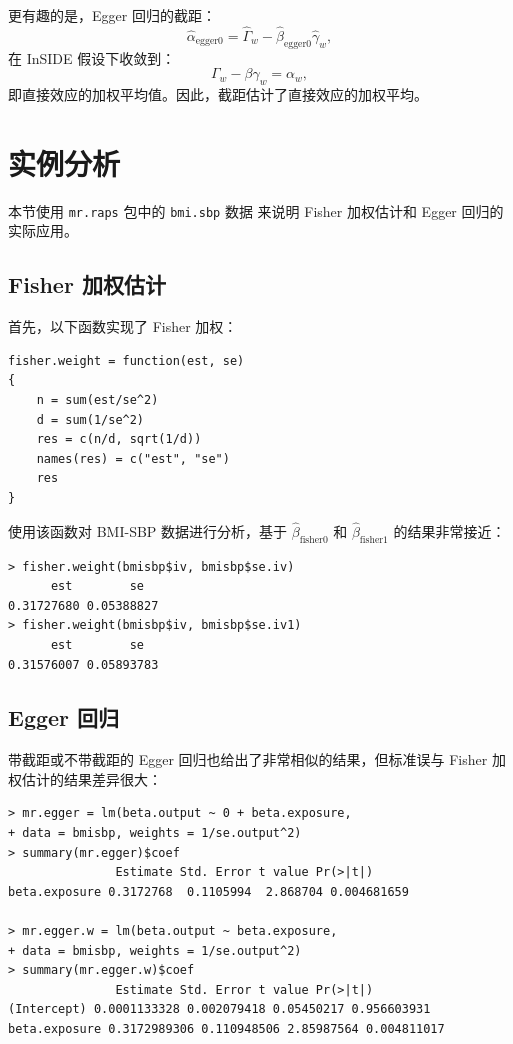 更有趣的是，Egger 回归的截距：
\[
\hat\alpha_{\mathrm{egger0}} = \hat\Gamma_w - \hat\beta_{\mathrm{egger0}} \hat\gamma_w, \tag{25.20}
\]
在 InSIDE 假设下收敛到：
\[
\Gamma_w - \beta\gamma_w = \alpha_w, \tag{25.21}
\]
即直接效应的加权平均值。因此，截距估计了直接效应的加权平均。

\section{实例分析}\label{sec:25-example}

本节使用 \texttt{mr.raps} 包中的 \texttt{bmi.sbp} 数据 \citep{Zhao2020} 来说明 Fisher 加权估计和 Egger 回归的实际应用。

\subsection{Fisher 加权估计}\label{sec:25-fisher-weighting}

首先，以下函数实现了 Fisher 加权：

\begin{verbatim}
fisher.weight = function(est, se)
{
    n = sum(est/se^2)
    d = sum(1/se^2)
    res = c(n/d, sqrt(1/d))
    names(res) = c("est", "se")
    res
}
\end{verbatim}

使用该函数对 BMI-SBP 数据进行分析，基于 $\hat\beta_{\mathrm{fisher0}}$ 和 $\hat\beta_{\mathrm{fisher1}}$ 的结果非常接近：

\begin{verbatim}
> fisher.weight(bmisbp$iv, bmisbp$se.iv)
      est        se
0.31727680 0.05388827
> fisher.weight(bmisbp$iv, bmisbp$se.iv1)
      est        se
0.31576007 0.05893783
\end{verbatim}

\subsection{Egger 回归}\label{sec:25-egger-regression-example}

带截距或不带截距的 Egger 回归也给出了非常相似的结果，但标准误与 Fisher 加权估计的结果差异很大：

\begin{verbatim}
> mr.egger = lm(beta.output ~ 0 + beta.exposure,
+ data = bmisbp, weights = 1/se.output^2)
> summary(mr.egger)$coef
               Estimate Std. Error t value Pr(>|t|)
beta.exposure 0.3172768  0.1105994  2.868704 0.004681659

> mr.egger.w = lm(beta.output ~ beta.exposure,
+ data = bmisbp, weights = 1/se.output^2)
> summary(mr.egger.w)$coef
               Estimate Std. Error t value Pr(>|t|)
(Intercept) 0.0001133328 0.002079418 0.05450217 0.956603931
beta.exposure 0.3172989306 0.110948506 2.85987564 0.004811017
\end{verbatim}


